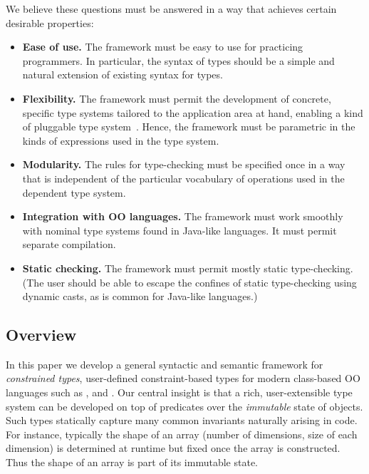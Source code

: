 We believe these questions must be answered in a way that achieves
certain desirable properties:
\begin{itemize}
\item 
{\bf Ease of use.}  The framework must be easy to use for practicing
programmers. In particular, the syntax of types should be a simple and
natural extension of existing syntax for types.

\item
{\bf Flexibility.}
The framework
must permit the development of concrete,
specific type systems tailored to the application area at
hand, enabling a kind of pluggable type system~\cite{bracha04-pluggable}.
Hence, the framework must be parametric in the kinds of
expressions used in the type system.

\item
{\bf Modularity.}
The rules for type-checking
must be specified once in a way that is independent of the
particular vocabulary of operations used in the dependent type
system.

\item
{\bf Integration with OO languages.}
The framework must work smoothly with nominal type systems found in
Java-like languages. It must permit separate compilation.

\item
{\bf Static checking.}  The framework must permit mostly static
type-checking. (The user should be able to escape the confines of
static type-checking using dynamic casts, as is common for Java-like
languages.)
\end{itemize}

\subsection{Overview}

In this paper we develop a general syntactic and semantic framework
for {\em constrained types}, user-defined constraint-based types for
modern class-based OO languages such as \java{}, \csharp{} and
\Xten{}. Our central insight is that a rich, user-extensible type
system can be developed on top of predicates over the {\em immutable}
state of objects. Such types statically capture many common invariants
naturally arising in code. For instance, typically the shape of an
array (number of dimensions, size of each dimension) is determined at
runtime but fixed once the array is constructed. Thus the shape of an
array is part of its immutable state.

